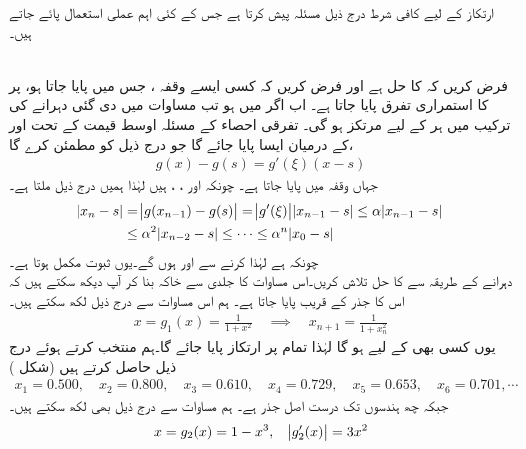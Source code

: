 ارتکاز کے لیے کافی شرط درج ذیل مسئلہ پیش کرتا ہے جس کے کئی اہم عملی استعمال پائے جاتے ہیں۔

\quad {}\\
فرض کریں کہ  کا حل  ہے اور فرض کریں کہ کسی ایسے وقفہ ، جس میں  پایا جاتا ہو، پر  کا استمراری تفرق پایا جاتا ہے۔ اب اگر  میں  ہو تب مساوات  میں دی گئی دہرانے کی ترکیب  میں ہر  کے لیے مرتکز ہو گی۔
\quad
تفرقی احصاء کے مسئلہ اوسط قیمت کے تحت  اور  کے درمیان ایسا  پایا جائے گا جو درج ذیل کو مطمئن کرے گا،
\begin{align*}
g(x)-g(s)=g'(\xi)(x-s) 
\end{align*}
جہاں  وقفہ  میں پایا جاتا ہے۔  چونکہ  اور ، ،  ہیں لہٰذا ہمیں درج ذیل ملتا ہے۔
\begin{align*}
\abs{x_n-s}&=\abs{g(x_{n-1})-g(s)}=\abs{g'(\xi)}\abs{x_{n-1}-s}\le \alpha \abs{x_{n-1}-s}\\
&\le \alpha^2\abs{x_{n-2}-s}\le \cdots \le \alpha^n\abs{x_{0}-s}
\end{align*}
چونکہ  ہے لہٰذا   کرنے سے  اور  ہوں گے۔یوں ثبوت مکمل ہوتا ہے۔
\quad {}\\
دہرانے کے طریقہ سے  کا حل  تلاش کریں۔اس مساوات کا جلدی سے خاکہ  بنا کر آپ دیکھ سکتے ہیں کہ اس کا جذر  کے قریب پایا جاتا ہے۔  ہم اس  مساوات سے درج ذیل لکھ سکتے ہیں۔
\begin{align*}
x=g_1(x)=\frac{1}{1+x^2}\quad \implies \quad x_{n+1}=\frac{1}{1+x_n^2}
\end{align*}
یوں کسی بھی  کے لیے  ہو گا لہٰذا تمام  پر ارتکاز پایا  جائے گا۔ہم  منتخب کرتے ہوئے درج ذیل حاصل کرتے ہیں (شکل )
\begin{align*}
x_1=0.500,\quad x_2=0.800,\quad x_3=0.610,\quad x_4=0.729,\quad x_5=0.653,\quad x_6=0.701,\cdots
\end{align*}
جبکہ چھ ہندسوں تک درست اصل جذر  ہے۔ ہم مساوات سے درج ذیل بھی لکھ سکتے ہیں۔
\begin{align*}
x=g_2(x)=1-x^3,\quad \abs{g_2'(x)}=3x^2 
\end{align*}
